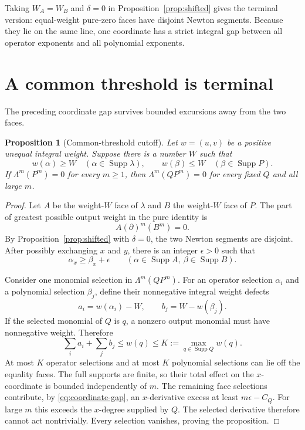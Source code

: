 \documentclass[11pt]{article}
\newtheorem{proposition}[theorem]{Proposition}
\newcommand{\Supp}{\operatorname{Supp}}
\begin{document}
Taking $W_A=W_B$ and $\delta=0$ in
Proposition~\ref{prop:shifted} gives the terminal version: equal-weight
pure-zero faces have disjoint Newton segments.  Because they lie on the
same line, one coordinate has a strict integral gap between all operator
exponents and all polynomial exponents.

\section{A common threshold is terminal}

The preceding coordinate gap survives bounded excursions away from the
two faces.

\begin{proposition}[Common-threshold cutoff]\label{prop:threshold}
Let $w=(u,v)$ be a positive unequal integral weight.  Suppose there is a
number $W$ such that
\begin{equation}\label{eq:threshold}
 w(\alpha)\geq W\quad(\alpha\in\Supp\lambda),
 \qquad
 w(\beta)\leq W\quad(\beta\in\Supp P).
\end{equation}
If $\Lambda^m(P^m)=0$ for every $m\geq1$, then
$\Lambda^m(QP^m)=0$ for every fixed $Q$ and all large $m$.
\end{proposition}

\begin{proof}
Let $A$ be the weight-$W$ face of $\lambda$ and $B$ the weight-$W$ face
of $P$.  The part of greatest possible output weight in the pure identity
is
\[
 A(\partial)^m(B^m)=0.
\]
By Proposition~\ref{prop:shifted} with $\delta=0$, the two Newton segments
are disjoint.  After possibly exchanging $x$ and $y$, there is an integer
$\epsilon>0$ such that
\begin{equation}\label{eq:coordinate-gap}
 \alpha_x\geq\beta_x+\epsilon
 \qquad
 (\alpha\in\Supp A,\ \beta\in\Supp B).
\end{equation}

Consider one monomial selection in $\Lambda^m(QP^m)$.  For an operator
selection $\alpha_i$ and a polynomial selection $\beta_j$, define their
nonnegative integral weight defects
\[
 a_i=w(\alpha_i)-W,
 \qquad b_j=W-w(\beta_j).
\]
If the selected monomial of $Q$ is $q$, a nonzero output monomial must have
nonnegative weight.  Therefore
\[
 \sum_i a_i+\sum_j b_j\leq w(q)\leq
 K:=\max_{q\in\Supp Q}w(q).
\]
At most $K$ operator selections and at most $K$ polynomial selections can
lie off the equality faces.  The full supports are finite, so their total
effect on the $x$-coordinate is bounded independently of $m$.  The remaining
face selections contribute, by \eqref{eq:coordinate-gap}, an $x$-derivative
excess at least $m\epsilon-C_Q$.  For large $m$ this exceeds the
$x$-degree supplied by $Q$.  The selected derivative therefore cannot act
nontrivially.  Every selection vanishes, proving the proposition.
\end{proof}
\end{document}
